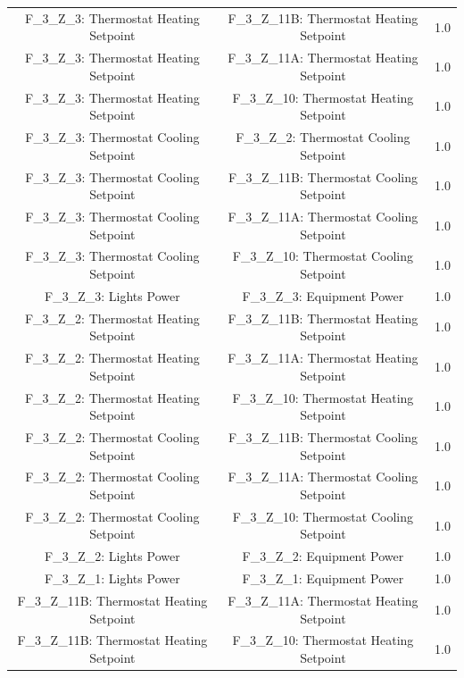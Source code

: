 \documentclass[aps, 10pt, a4paper]{article}
\begin{document}
\begin{longtable}{c|c||c}
                    F\_3\_Z\_3: Thermostat Heating Setpoint & F\_3\_Z\_11B: Thermostat Heating Setpoint & 1.0 \\
                    F\_3\_Z\_3: Thermostat Heating Setpoint & F\_3\_Z\_11A: Thermostat Heating Setpoint & 1.0 \\
                    F\_3\_Z\_3: Thermostat Heating Setpoint & F\_3\_Z\_10: Thermostat Heating Setpoint & 1.0 \\
                    F\_3\_Z\_3: Thermostat Cooling Setpoint & F\_3\_Z\_2: Thermostat Cooling Setpoint & 1.0 \\
                    F\_3\_Z\_3: Thermostat Cooling Setpoint & F\_3\_Z\_11B: Thermostat Cooling Setpoint & 1.0 \\
                    F\_3\_Z\_3: Thermostat Cooling Setpoint & F\_3\_Z\_11A: Thermostat Cooling Setpoint & 1.0 \\
                    F\_3\_Z\_3: Thermostat Cooling Setpoint & F\_3\_Z\_10: Thermostat Cooling Setpoint & 1.0 \\
                    F\_3\_Z\_3: Lights Power & F\_3\_Z\_3: Equipment Power & 1.0 \\
                    F\_3\_Z\_2: Thermostat Heating Setpoint & F\_3\_Z\_11B: Thermostat Heating Setpoint & 1.0 \\
                    F\_3\_Z\_2: Thermostat Heating Setpoint & F\_3\_Z\_11A: Thermostat Heating Setpoint & 1.0 \\
                    F\_3\_Z\_2: Thermostat Heating Setpoint & F\_3\_Z\_10: Thermostat Heating Setpoint & 1.0 \\
                    F\_3\_Z\_2: Thermostat Cooling Setpoint & F\_3\_Z\_11B: Thermostat Cooling Setpoint & 1.0 \\
                    F\_3\_Z\_2: Thermostat Cooling Setpoint & F\_3\_Z\_11A: Thermostat Cooling Setpoint & 1.0 \\
                    F\_3\_Z\_2: Thermostat Cooling Setpoint & F\_3\_Z\_10: Thermostat Cooling Setpoint & 1.0 \\
                    F\_3\_Z\_2: Lights Power & F\_3\_Z\_2: Equipment Power & 1.0 \\
                    F\_3\_Z\_1: Lights Power & F\_3\_Z\_1: Equipment Power & 1.0 \\
                    F\_3\_Z\_11B: Thermostat Heating Setpoint & F\_3\_Z\_11A: Thermostat Heating Setpoint & 1.0 \\
                    F\_3\_Z\_11B: Thermostat Heating Setpoint & F\_3\_Z\_10: Thermostat Heating Setpoint & 1.0 \\

\end{longtable}
\end{document}
